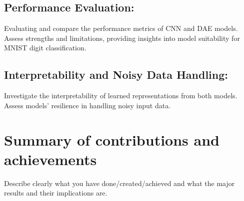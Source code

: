 \subsection{Performance Evaluation:}
Evaluating and compare the performance metrics of CNN and DAE models.
Assess strengths and limitations, providing insights into model suitability for MNIST digit classification.

\subsection{Interpretability and Noisy Data Handling:}
Investigate the interpretability of learned representations from both models.
Assess models' resilience in handling noisy input data.

\section{Summary of contributions and achievements} %
\label{sec:intro_sum_results} %
Describe clearly what you have done/created/achieved and what the major results and their implications are. 



